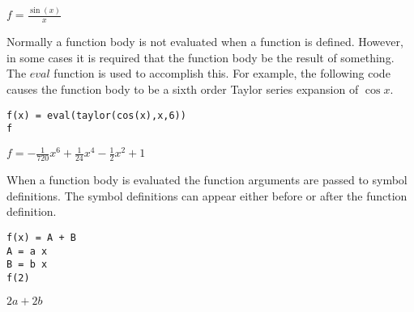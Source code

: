 \noindent
$\displaystyle f=\frac{\sin(x)}{x}$

\bigskip
\noindent
Normally a function body is not evaluated when a function is defined.
However, in some cases it is required that the function body be the
result of something.
The $eval$ function is used to accomplish this.
For example, the following code causes the function body to be a sixth order Taylor series expansion of $\cos x$.

\begin{Verbatim}[formatcom=\color{blue}]
f(x) = eval(taylor(cos(x),x,6))
f
\end{Verbatim}

\noindent
$\displaystyle f=-\tfrac{1}{720}x^6+\tfrac{1}{24}x^4-\tfrac{1}{2}x^2+1$

\bigskip
\noindent
When a function body is evaluated the function arguments
are passed to symbol definitions.
The symbol definitions can appear either before or after
the function definition.

\begin{Verbatim}[formatcom=\color{blue}]
f(x) = A + B
A = a x
B = b x
f(2)
\end{Verbatim}

\noindent
$\displaystyle 2a+2b$

